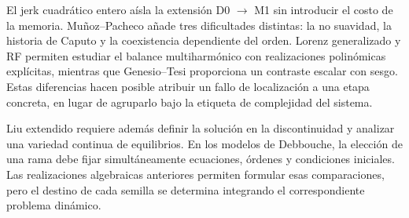 El jerk cuadrático entero aísla la extensión D0 \(\to\) M1 sin introducir
el costo de la memoria. Muñoz--Pacheco añade tres dificultades distintas:
la no suavidad, la historia de Caputo y la coexistencia dependiente del orden.
Lorenz generalizado y RF permiten estudiar el balance multiharmónico con
realizaciones polinómicas explícitas, mientras que Genesio--Tesi proporciona
un contraste escalar con sesgo. Estas diferencias hacen posible atribuir un
fallo de localización a una etapa concreta, en lugar de agruparlo bajo la
etiqueta de complejidad del sistema.

Liu extendido requiere además definir la solución en la discontinuidad y
analizar una variedad continua de equilibrios. En los modelos de Debbouche,
la elección de una rama debe fijar simultáneamente ecuaciones, órdenes y
condiciones iniciales. Las realizaciones algebraicas anteriores permiten
formular esas comparaciones, pero el destino de cada semilla se determina
integrando el correspondiente problema dinámico.

